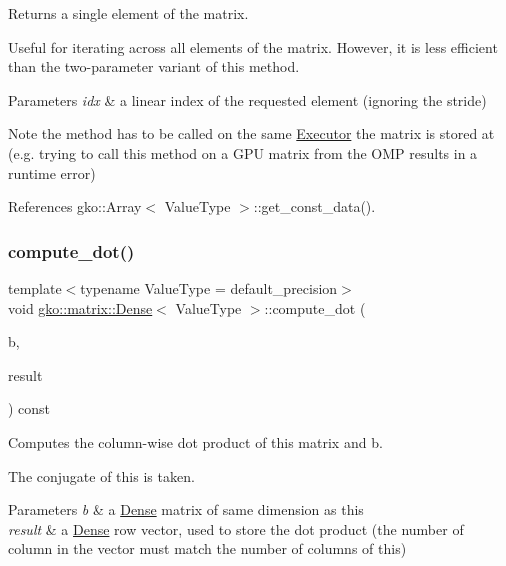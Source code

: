 Returns a single element of the matrix. 

Useful for iterating across all elements of the matrix. However, it is less efficient than the two-\/parameter variant of this method.


\begin{DoxyParams}{Parameters}
{\em idx} & a linear index of the requested element (ignoring the stride)\\
\hline
\end{DoxyParams}
\begin{DoxyNote}{Note}
the method has to be called on the same \hyperlink{classgko_1_1Executor}{Executor} the matrix is stored at (e.\+g. trying to call this method on a G\+PU matrix from the O\+MP results in a runtime error) 
\end{DoxyNote}


References gko\+::\+Array$<$ Value\+Type $>$\+::get\+\_\+const\+\_\+data().

\mbox{\label{classgko_1_1matrix_1_1Dense_acb568ff44addb095b82bbd2fbe704761}} 
\subsubsection{\texorpdfstring{compute\+\_\+dot()}{compute\_dot()}}
{\footnotesize\ttfamily template$<$typename Value\+Type = default\+\_\+precision$>$ \\
void \hyperlink{classgko_1_1matrix_1_1Dense}{gko\+::matrix\+::\+Dense}$<$ Value\+Type $>$\+::compute\+\_\+dot (\begin{DoxyParamCaption}\item[{const \hyperlink{classgko_1_1LinOp}{Lin\+Op} $\ast$}]{b,  }\item[{\hyperlink{classgko_1_1LinOp}{Lin\+Op} $\ast$}]{result }\end{DoxyParamCaption}) const\hspace{0.3cm}{\ttfamily [inline]}}



Computes the column-\/wise dot product of this matrix and {\ttfamily b}. 

The conjugate of this is taken.


\begin{DoxyParams}{Parameters}
{\em b} & a \hyperlink{classgko_1_1matrix_1_1Dense}{Dense} matrix of same dimension as this \\
\hline
{\em result} & a \hyperlink{classgko_1_1matrix_1_1Dense}{Dense} row vector, used to store the dot product (the number of column in the vector must match the number of columns of this) \\
\hline
\end{DoxyParams}


